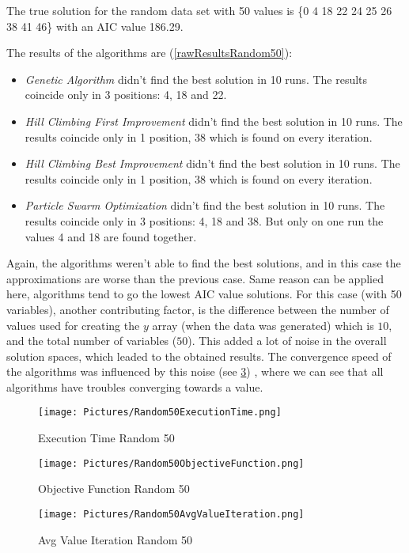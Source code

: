 The true solution for the random data set with 50  values is \{0 4 18 22 24 25 26 38 41 46\} with an AIC value 186.29.

The results of the algorithms are (\ref{rawResultsRandom50}):
\begin{itemize}
	\item \textit{Genetic Algorithm} didn't find the best solution in 10 runs. The results coincide only in 3 positions: 4, 18 and 22.
	\item \textit{Hill Climbing First Improvement} didn't find the best solution in 10 runs. The results coincide only in 1 position, 38 which is found on every iteration.
	\item \textit{Hill Climbing Best Improvement} didn't find the best solution in 10 runs. The results coincide only in 1 position, 38 which is found on every iteration.
	\item \textit{Particle Swarm Optimization} didn't find the best solution in 10 runs. The results coincide only in 3 positions: 4, 18 and 38. But only on one run the values 4 and 18 are found together. 
\end{itemize}

Again, the algorithms weren't able to find the best solutions, and in this case the approximations are worse than the previous case. Same reason can be applied here, algorithms tend to go the lowest AIC value solutions. For this case (with 50 variables), another contributing factor, is the difference between the number of values used for creating the $y$ array (when the data was generated) which is $10$, and the total number of variables ($50$). This added a lot of noise in the overall solution spaces, which leaded to the obtained results. The convergence speed of the algorithms was influenced by this noise (see \ref{Avg Value Iteration Random 50}) , where we can see that all algorithms have troubles converging towards a value.

\begin{figure}[ht]
	\texttt{[image: Pictures/Random50ExecutionTime.png]}
	\caption{ Execution Time Random 50}
	\label{Execution Time Random 50}
\end{figure}

\begin{figure}[ht]
	\texttt{[image: Pictures/Random50ObjectiveFunction.png]}
	\caption{ Objective Function Random 50 }
	\label{Objective Function Random 50}
\end{figure}

\begin{figure}[ht]
	\texttt{[image: Pictures/Random50AvgValueIteration.png]}
	\caption{ Avg Value Iteration Random 50 }
	\label{Avg Value Iteration Random 50}
\end{figure}

